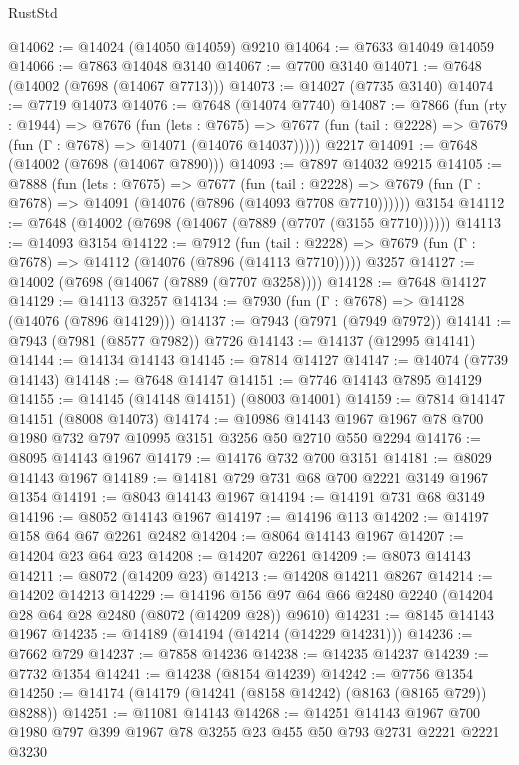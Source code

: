 \begin{lexlean}{RustStd}
\begin{coremodule}
{\begin{coremodule}
{{{{{{{{{{{{{{{{{{{{{{{{{{{{{{{{{{{{{{{{{{{{{{{{{{{{{@14062 := @14024 (@14050 @14059) @9210
@14064 := @7633 @14049 @14059
@14066 := @7863 @14048 @3140
@14067 := @7700 @3140
@14071 := @7648 (@14002 (@7698 (@14067 @7713)))
@14073 := @14027 (@7735 @3140)
@14074 := @7719 @14073
@14076 := @7648 (@14074 @7740)
@14087 := @7866
    (fun (rty : @1944) =>
    @7676
      (fun (lets : @7675) =>
      @7677 (fun (tail : @2228) => @7679 (fun (Γ : @7678) => @14071 (@14076 @14037)))))
    @2217
@14091 := @7648 (@14002 (@7698 (@14067 @7890)))
@14093 := @7897 @14032 @9215
@14105 := @7888
    (fun (lets : @7675) =>
    @7677
      (fun (tail : @2228) =>
      @7679 (fun (Γ : @7678) => @14091 (@14076 (@7896 (@14093 @7708 @7710))))))
    @3154
@14112 := @7648 (@14002 (@7698 (@14067 (@7889 (@7707 (@3155 @7710))))))
@14113 := @14093 @3154
@14122 := @7912
    (fun (tail : @2228) => @7679 (fun (Γ : @7678) => @14112 (@14076 (@7896 (@14113 @7710)))))
    @3257
@14127 := @14002 (@7698 (@14067 (@7889 (@7707 @3258))))
@14128 := @7648 @14127
@14129 := @14113 @3257
@14134 := @7930 (fun (Γ : @7678) => @14128 (@14076 (@7896 @14129)))
@14137 := @7943 (@7971 (@7949 @7972))
@14141 := @7943 (@7981 (@8577 @7982)) @7726
@14143 := @14137 (@12995 @14141)
@14144 := @14134 @14143
@14145 := @7814 @14127
@14147 := @14074 (@7739 @14143)
@14148 := @7648 @14147
@14151 := @7746 @14143 @7895 @14129
@14155 := @14145 (@14148 @14151) (@8003 @14001)
@14159 := @7814 @14147 @14151 (@8008 @14073)
@14174 := @10986 @14143 @1967 @1967 @78 @700 @1980 @732 @797 @10995 @3151 @3256 @50 @2710 @550 @2294
@14176 := @8095 @14143 @1967
@14179 := @14176 @732 @700 @3151
@14181 := @8029 @14143 @1967
@14189 := @14181 @729 @731 @68 @700 @2221 @3149 @1967 @1354
@14191 := @8043 @14143 @1967
@14194 := @14191 @731 @68 @3149
@14196 := @8052 @14143 @1967
@14197 := @14196 @113
@14202 := @14197 @158 @64 @67 @2261 @2482
@14204 := @8064 @14143 @1967
@14207 := @14204 @23 @64 @23
@14208 := @14207 @2261
@14209 := @8073 @14143
@14211 := @8072 (@14209 @23)
@14213 := @14208 @14211 @8267
@14214 := @14202 @14213
@14229 := @14196 @156 @97 @64 @66 @2480 @2240 (@14204 @28 @64 @28 @2480 (@8072 (@14209 @28)) @9610)
@14231 := @8145 @14143 @1967
@14235 := @14189 (@14194 (@14214 (@14229 @14231)))
@14236 := @7662 @729
@14237 := @7858 @14236
@14238 := @14235 @14237
@14239 := @7732 @1354
@14241 := @14238 (@8154 @14239)
@14242 := @7756 @1354
@14250 := @14174 (@14179 (@14241 (@8158 @14242) (@8163 (@8165 @729)) @8288))
@14251 := @11081 @14143
@14268 := @14251
    @14143
    @1967
    @700
    @1980
    @797
    @399
    @1967
    @78
    @3255
    @23
    @455
    @50
    @793
    @2731
    @2221
    @2221
    @3230
}}}}}}}}}}}}}}}}}}}}}}}}}}}}}}}}}}}}}}}}}}}}}}}}}}}}}
\end{coremodule}}
\end{coremodule}
\end{lexlean}
